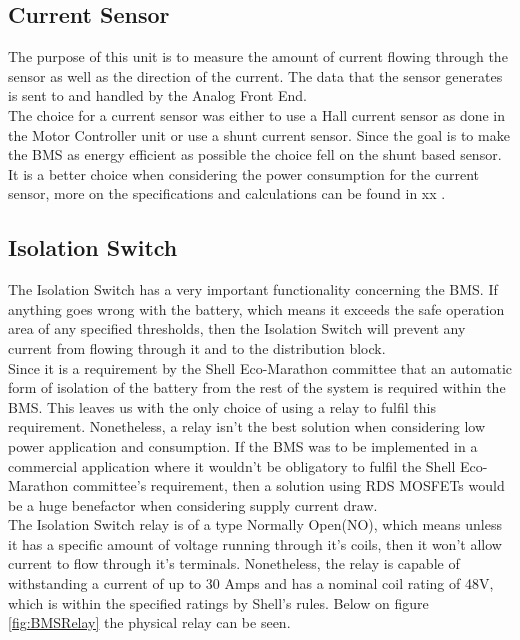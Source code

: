 \subsection{Current Sensor}
The purpose of this unit is to measure the amount of current flowing through the sensor as well as the direction of the current. The data that the sensor generates is sent to and handled by the Analog Front End. \\
The choice for a current sensor was either to use a Hall current sensor as done in the Motor Controller unit or use a shunt current sensor. Since the goal is to make the BMS as energy efficient as possible the choice fell on the shunt based sensor. It is a better choice when considering the power consumption for the current sensor, more on the specifications and calculations can be found in xx .

\subsection{Isolation Switch}
The Isolation Switch has a very important functionality concerning the BMS. If anything goes wrong with the battery, which means it exceeds the safe operation area of any specified thresholds, then the Isolation Switch will prevent any current from flowing through it and to the distribution block. \\
Since it is a requirement by the Shell Eco-Marathon committee that an automatic form of isolation of the battery from the rest of the system is required within the BMS. This leaves us with the only choice of using a relay to fulfil this requirement. Nonetheless, a relay isn't the best solution when considering low power application and consumption. If the BMS was to be implemented in a commercial application where it wouldn't be obligatory to fulfil the Shell Eco-Marathon committee's requirement, then a solution using RDS MOSFETs would be a huge benefactor when considering supply current draw.\\
The Isolation Switch relay is of a type Normally Open(NO), which means unless it has a specific amount of voltage running through it's coils, then it won't allow current to flow through it's terminals. Nonetheless, the relay is  capable of withstanding a current of up to 30 Amps and has a nominal coil rating of 48V, which is within the specified ratings by Shell's rules. Below on figure \ref{fig:BMSRelay} the physical relay can be seen.

